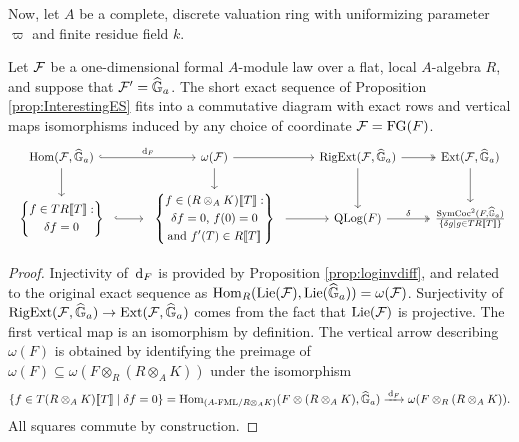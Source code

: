 \documentclass[../main.tex]{subfiles}
\begin{document}
Now, let $A$ be a complete, discrete valuation ring with 
uniformizing parameter $\varpi$ and finite residue field $k$. 
\begin{prop} \label{prop:ExplicitInterestingES}
  Let $\mathcal{F}$ be a one-dimensional formal $A$-module law over a flat, local
  $A$-algebra $R$, and suppose that $\mathcal{F}' = \widehat{\mathbb{G}}_a$.
  The short exact sequence of Proposition \ref{prop:InterestingES}
  fits into a commutative diagram with 
  exact rows and vertical maps isomorphisms induced by 
  any choice of coordinate $\mathcal{F} = \textnormal{FG}(F)$.
\begin{equation*}
\begin{tikzcd}[ampersand replacement=\&]
  {\Hom(\cF,\Ghat_a)} \& {\omega(\cF)} \& {\RigExt(\cF,\Ghat_a)} \&
  {\Ext(\cF,\Ghat_a)} \\ 
  \begin{array}{c} \left\{\begin{gathered} f \in TR\llbr T \rrbr : \\  \delta f
    = 0\end{gathered}  \right\} \end{array} \& \begin{array}{c}
    \left\{\begin{gathered} f \in (R\otimes_A K)\llbr T \rrbr : \\ 
  \text{$\delta f = 0$, $f(0) = 0$} \\
    \text{and $f'(T) \in R\llbr T \rrbr$}\end{gathered} \right\} \end{array} \& {\QLog(F)} \&
    {\frac{\SymCoc^2(F, \Ghat_a)}{\{\delta g \mid g \in T R\llbr T \rrbr\}}}
	\arrow[hook, "{\dc_F}", from=1-1, to=1-2]
	\arrow[from=1-1, to=2-1]
	\arrow[from=1-2, to=1-3]
	\arrow[from=1-2, to=2-2]
	\arrow[two heads, from=1-3, to=1-4]
	\arrow[from=1-3, to=2-3]
	\arrow[from=1-4, to=2-4]
	\arrow[hook, from=2-1, to=2-2]
	\arrow[from=2-2, to=2-3]
	\arrow["\delta", two heads, from=2-3, to=2-4]
\end{tikzcd}
\end{equation*}
\begin{proof}
  Injectivity of $\, \mathrm{d}_F$ is provided by Proposition \ref{prop:loginvdiff},
  and related to the original exact sequence as $\operatorname{Hom}_R(\operatorname{Lie}(\mathcal{F}), \operatorname{Lie}(\widehat{\mathbb{G}}_a)) = 
  \omega(\mathcal{F})$.
  Surjectivity of $\operatorname {RigExt}(\mathcal{F}, \widehat{\mathbb{G}}_a) \to \operatorname{Ext}(\mathcal{F}, \widehat{\mathbb{G}}_a)$ comes from the
  fact that $\operatorname{Lie}(\mathcal{F})$ is projective. 
  The first vertical map is an isomorphism by definition. 
  The vertical arrow describing $\omega(F)$ is obtained by
  identifying the preimage of $\omega(F) \subseteq \omega(F \otimes_R (R
  \otimes_AK))$ under the isomorphism 
  \begin{equation*}
    \{f \in T(R \otimes_A K)\llbracket T \rrbracket \mid \delta f = 0\} = \operatorname{Hom}_{{({A}\text-\allowbreak\mathrm{FML}/{R \otimes_A K})}} (F \otimes (R \otimes_A K), \widehat{\mathbb{G}}_a) \xrightarrow{\, \mathrm{d}_F} \omega(F
    \otimes_R (R \otimes_AK)).
  \end{equation*}
  All squares commute by construction.
\end{proof}
\end{prop}
\end{document}
